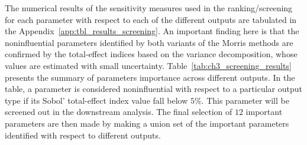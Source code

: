 The numerical results of the sensitivity measures used in the ranking/screening for each parameter with respect to each of the different outputs are tabulated in the Appendix~\ref{app:tbl_results_screening}.
An important finding here is that the noninfluential parameters identified by both variants of the Morris methods are confirmed by the total-effect indices based on the variance decomposition, whose values are estimated with small uncertainty.
Table~\ref{tab:ch3_screening_results} presents the summary of parameters importance across different outputs.
In the table, a parameter is considered noninfluential with respect to a particular output type if its Sobol' total-effect index value fall below $5\%$.
This parameter will be screened out in the downstream analysis.
The final selection of $12$ important parameters are then made by making a union set of the important parameters identified with respect to different outputs.

